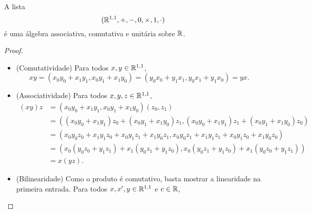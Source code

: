 \begin{proposition}
A lista
	\begin{equation*}
	(\mathbb{R}^{1,1},+,-,0,\times,1,\cdot)
	\end{equation*}
é uma álgebra associativa, comutativa e unitária sobre $\mathbb{R}$.
\end{proposition}
\begin{proof}
\begin{itemize}
	\item (Comutatividade) Para todos $x,y \in \mathbb{R}^{1,1}$,
		\begin{equation*}
		xy = (x_0y_0 + x_1y_1,x_0y_1+x_1y_0) = (y_0x_0 + y_1x_1, y_0x_1+y_1x_0) = yx.
		\end{equation*}
	\item (Associatividade) Para todos $x,y,z \in \mathbb{R}^{1,1}$,
		\begin{align*}
		(xy)z &= (x_0y_0 + x_1y_1, x_0y_1+x_1y_0)(z_0,z_1) \\
				&= ((x_0y_0 + x_1y_1)z_0 + (x_0y_1+x_1y_0)z_1, (x_0y_0 + x_1y_1)z_1 + (x_0y_1+x_1y_0)z_0) \\
				&= (x_0y_0z_0 + x_1y_1z_0 + x_0y_1z_1+x_1y_0z_1, x_0y_0z_1 + x_1y_1z_1 + x_0y_1z_0+x_1y_0z_0) \\
				&= (x_0(y_0z_0+y_1z_1) + x_1(y_0z_1+y_1z_0), x_0(y_0z_1+y_1z_0) + x_1(y_0z_0+y_1z_1)) \\
				&= x(yz).
		\end{align*}
	\item (Bilinearidade) Como o produto é comutativo, basta mostrar a linearidade na primeira entrada. Para todos $x,x',y \in \mathbb{R}^{1,1}$ e $c \in \mathbb{R}$,

\end{itemize}
\end{proof}
